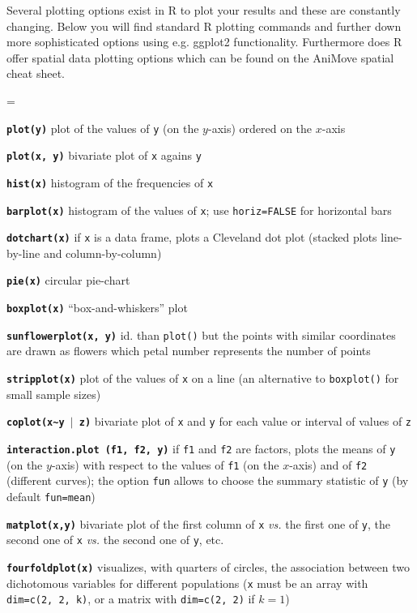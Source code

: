 \documentclass[8pt,landscape]{article}
\newcommand{\code}{\texttt}
\newcommand{\bcode}[1]{\texttt{\textbf{#1}}}
\begin{document}
\begin{multicols*}{3}
Several plotting options exist in R to plot your results and these are constantly changing. Below you will find standard R plotting commands and further down more sophisticated options using e.g. ggplot2 functionality. Furthermore does R offer spatial data plotting options which can be found on the AniMove spatial cheat sheet.


\everypar={\hangindent=9mm}

\bcode{plot(y)}  plot of the values of \code{y} (on the $y$-axis) ordered on the $x$-axis

\bcode{plot(x, y)}  bivariate plot of \code{x} agains \code{y}

\bcode{hist(x)}  histogram of the frequencies of \code{x}

\bcode{barplot(x)}  histogram of the values of \code{x}; use
\code{horiz=FALSE} for horizontal bars

\bcode{dotchart(x)}  if \code{x} is a data frame, plots a Cleveland dot plot (stacked plots line-by-line and column-by-column)

\bcode{pie(x)}  circular pie-chart

\bcode{boxplot(x)}  ``box-and-whiskers'' plot

\bcode{sunflowerplot(x, y)}  id. than \code{plot()} but the points with similar coordinates are drawn as flowers which petal number represents the number of points

\bcode{stripplot(x)}  plot of the values of \code{x} on a line (an alternative to \code{boxplot()} for small sample sizes)

\bcode{coplot(x\~{}y $\mid$ z)}  bivariate plot of \code{x} and \code{y} for each value or interval of values of \code{z}

\bcode{interaction.plot (f1, f2, y)}  if \code{f1} and \code{f2} are factors, plots the means of \code{y} (on the $y$-axis) with respect to the values of \code{f1} (on the $x$-axis) and of \code{f2} (different curves); the option \code{fun} allows to choose the summary statistic of \code{y} (by default \code{fun=mean})

\bcode{matplot(x,y)}  bivariate plot of the first column of \code{x} {\it vs.} the first one of \code{y}, the second one of \code{x} {\it vs.} the second one of \code{y}, etc.

\bcode{fourfoldplot(x)}  visualizes, with quarters of circles, the association between two dichotomous variables for different populations (\code{x} must be an array with \code{dim=c(2, 2, k)}, or a matrix with \code{dim=c(2, 2)} if $k=1$)


\end{multicols*}
\end{document}
